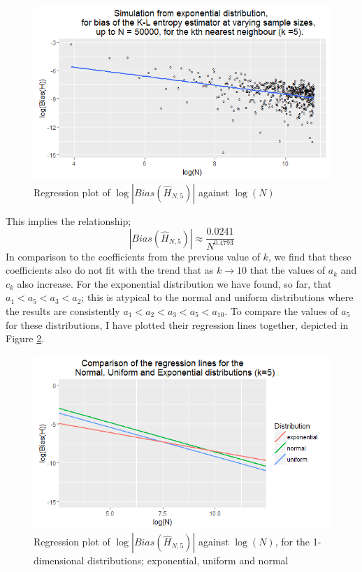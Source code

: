 \documentclass{report}
\begin{document}
\begin{figure}
  \begin{center}
    \includegraphics[width=\textwidth]{./Graphs/Expo_k=5_plot.png}
  \end{center}
\caption{Regression plot of $\log|Bias(\hat{H}_{N, 5})|$ against $\log(N)$}
  \label{expo_k=5_graph}
\end{figure}

This implies the relationship;
\begin{equation}
|Bias(\hat{H}_{N, 5})| \approx \frac{0.0241}{N^{0.4793}}\nonumber
\end{equation}
In comparison to the coefficients from the previous value of $k$, we find that these coefficients also do not fit with the trend that as $k \to 10$ that the values of $a_{k}$ and $c_{k}$ also increase. For the exponential distribution we have found, so far, that $a_{1} < a_{5} < a_{3} < a_{2}$; this is atypical to the normal and uniform distributions where the results are consistently $a_{1} < a_{2} < a_{3} < a_{5} < a_{10}$. To compare the values of $a_{5}$ for these distributions, I have plotted their regression lines together, depicted in Figure \ref{E_U_N_k=5_graph}.

\begin{figure}
  \begin{center}
    \includegraphics[width=\textwidth]{./Graphs/EUN_k=5_plot.png}
  \end{center}
\caption{Regression plot of $\log|Bias(\hat{H}_{N,5})|$ against $\log(N)$, for the 1-dimensional distributions; exponential, uniform and normal}
  \label{E_U_N_k=5_graph}
\end{figure}
\end{document}
